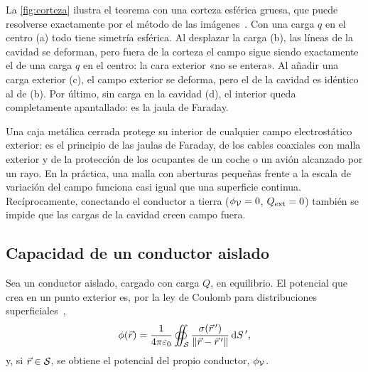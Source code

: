 La \cref{fig:corteza} ilustra el teorema con una corteza esférica gruesa, que puede resolverse exactamente por el método de las imágenes~\cite{JACKSON}.
Con una carga $q$ en el centro (a) todo tiene simetría esférica. Al desplazar la carga (b), las líneas de la cavidad se deforman, pero fuera de la
corteza el campo sigue siendo exactamente el de una carga $q$ en el centro: la cara exterior «no se entera». Al añadir una carga exterior (c), el
campo exterior se deforma, pero el de la cavidad es idéntico al de (b). Por último, sin carga en la cavidad (d), el interior queda completamente
apantallado: es la jaula de Faraday.



\begin{observacion}\label{obs:jaula}
Una caja metálica cerrada protege su interior de cualquier campo electrostático exterior: es el principio de las jaulas de Faraday, de los cables
coaxiales con malla exterior y de la protección de los ocupantes de un coche o un avión alcanzado por un rayo. En la práctica, una malla con aberturas
pequeñas frente a la escala de variación del campo funciona casi igual que una superficie continua. Recíprocamente, conectando el conductor a tierra
($\phi_{\mathcal{V}}=0$, $Q_{\mathrm{ext}}=0$) también se impide que las cargas de la cavidad creen campo fuera.
\end{observacion}

\subsection{Capacidad de un conductor aislado}\label{sec:capacidad}
Sea un conductor aislado, cargado con carga $Q$, en equilibrio. El potencial que crea en un punto exterior es, por la ley de Coulomb para
distribuciones superficiales~\cite{TEMA1},
\begin{equation}\label{eq:pot-conductor}
  \phi(\vec{r})=\frac{1}{4\pi\varepsilon_{0}}\oiint_{\mathcal{S}}\frac{\sigma(\vec{r}\,')}{\lVert \vec{r}-\vec{r}\,'\rVert}\,\mathrm{d} S\,' ,
\end{equation}
y, si $\vec{r}\in\mathcal{S}$, se obtiene el potencial del propio conductor, $\phi_{\mathcal{V}}$.


